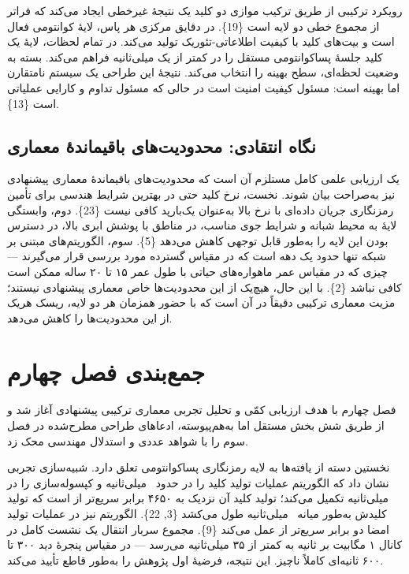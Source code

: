 \documentclass[a4paper,14pt]{extreport}
\begin{document}
رویکرد ترکیبی از طریق ترکیب موازی دو کلید یک نتیجهٔ غیرخطی ایجاد می‌کند که فراتر از مجموع خطی دو لایه است \{19\}. در دقایق مرکزی هر پاس، لایهٔ کوانتومی فعال است و بیت‌های کلید با کیفیت اطلاعاتی-تئوریک تولید می‌کند. در تمام لحظات، لایهٔ  یک کلید جلسهٔ پساکوانتومی مستقل را در کمتر از یک میلی‌ثانیه فراهم می‌کند.  بسته به وضعیت  لحظه‌ای، سطح بهینه را انتخاب می‌کند. نتیجهٔ این طراحی یک سیستم نامتقارن اما بهینه است:  مسئول کیفیت امنیت است در حالی که  مسئول تداوم و کارایی عملیاتی است \{13\}.

\subsection{نگاه انتقادی: محدودیت‌های باقیماندهٔ معماری}

یک ارزیابی علمی کامل مستلزم آن است که محدودیت‌های باقیماندهٔ معماری پیشنهادی نیز به‌صراحت بیان شوند. نخست، نرخ کلید  حتی در بهترین شرایط هندسی برای تأمین رمزنگاری جریان داده‌ای با نرخ بالا به‌عنوان یک‌بارپد  کافی نیست \{23\}. دوم، وابستگی لایهٔ  به محیط شبانه و شرایط جوی مناسب، در مناطق با پوشش ابری بالا، در دسترس بودن این لایه را به‌طور قابل توجهی کاهش می‌دهد \{5\}. سوم، الگوریتم‌های مبتنی بر شبکه تنها حدود یک دهه است که در مقیاس گسترده مورد بررسی قرار می‌گیرند --- چیزی که در مقیاس عمر ماهواره‌های حیاتی با طول عمر ۱۵ تا ۲۰ ساله ممکن است کافی نباشد \{2\}. با این حال، هیچ‌یک از این محدودیت‌ها خاص معماری پیشنهادی نیستند؛ مزیت معماری ترکیبی دقیقاً در آن است که با حضور همزمان هر دو لایه، ریسک هریک از این محدودیت‌ها را کاهش می‌دهد.

\section{جمع‌بندی فصل چهارم}

فصل چهارم با هدف ارزیابی کمّی و تحلیل تجربی معماری ترکیبی پیشنهادی آغاز شد و از طریق شش بخش مستقل اما به‌هم‌پیوسته، ادعاهای طراحی مطرح‌شده در فصل سوم را با شواهد عددی و استدلال مهندسی محک زد.

نخستین دسته از یافته‌ها به لایه رمزنگاری پساکوانتومی تعلق دارد. شبیه‌سازی تجربی نشان داد که الگوریتم  عملیات تولید کلید را در حدود ~میلی‌ثانیه و کپسوله‌سازی را در ~میلی‌ثانیه تکمیل می‌کند؛ تولید کلید آن نزدیک به ۴۶۵۰ برابر سریع‌تر از  است که تولید کلیدش به‌طور میانه ~میلی‌ثانیه طول می‌کشد \{3, 22\}. الگوریتم  نیز در عملیات تولید امضا دو برابر سریع‌تر از  عمل می‌کند \{9\}. مجموع سربار انتقال یک نشست کامل در کانال ۱ مگابیت بر ثانیه به کمتر از ۳۵ میلی‌ثانیه می‌رسد --- در مقیاس پنجرهٔ دید ۳۰۰ تا ۶۰۰ ثانیه‌ای کاملاً ناچیز. این نتیجه، فرضیهٔ اول پژوهش را به‌طور قاطع تأیید می‌کند.
\end{document}
